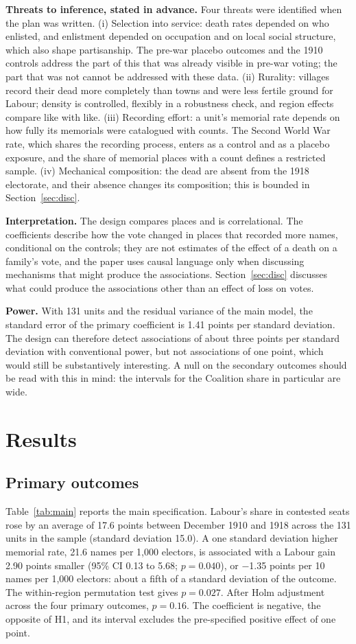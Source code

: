 \documentclass[11pt,a4paper]{article}
\begin{document}
\textbf{Threats to inference, stated in advance.} Four threats were identified when the plan was written. (i) Selection into service: death rates depended on who enlisted, and enlistment depended on occupation and on local social structure, which also shape partisanship. The pre-war placebo outcomes and the 1910 controls address the part of this that was already visible in pre-war voting; the part that was not cannot be addressed with these data. (ii) Rurality: villages record their dead more completely than towns and were less fertile ground for Labour; density is controlled, flexibly in a robustness check, and region effects compare like with like. (iii) Recording effort: a unit's memorial rate depends on how fully its memorials were catalogued with counts. The Second World War rate, which shares the recording process, enters as a control and as a placebo exposure, and the share of memorial places with a count defines a restricted sample. (iv) Mechanical composition: the dead are absent from the 1918 electorate, and their absence changes its composition; this is bounded in Section~\ref{sec:disc}.

\textbf{Interpretation.} The design compares places and is correlational. The coefficients describe how the vote changed in places that recorded more names, conditional on the controls; they are not estimates of the effect of a death on a family's vote, and the paper uses causal language only when discussing mechanisms that might produce the associations. Section~\ref{sec:disc} discusses what could produce the associations other than an effect of loss on votes.

\textbf{Power.} With 131 units and the residual variance of the main model, the standard error of the primary coefficient is 1.41 points per standard deviation. The design can therefore detect associations of about three points per standard deviation with conventional power, but not associations of one point, which would still be substantively interesting. A null on the secondary outcomes should be read with this in mind: the intervals for the Coalition share in particular are wide.

\section{Results}
\subsection{Primary outcomes}
Table~\ref{tab:main} reports the main specification. Labour's share in contested seats rose by an average of 17.6 points between December 1910 and 1918 across the 131 units in the sample (standard deviation 15.0). A one standard deviation higher memorial rate, 21.6 names per 1,000 electors, is associated with a Labour gain 2.90 points smaller (95\% CI 0.13 to 5.68; $p=0.040$), or $-$1.35 points per 10 names per 1,000 electors: about a fifth of a standard deviation of the outcome. The within-region permutation test gives $p=0.027$. After Holm adjustment across the four primary outcomes, $p=0.16$. The coefficient is negative, the opposite of H1, and its interval excludes the pre-specified positive effect of one point.
\end{document}
